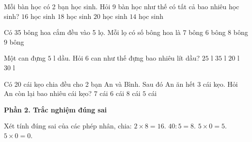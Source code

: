 \begin{ex} %
Mỗi bàn học có 2 bạn học sinh. Hỏi 9 bàn học như thế có tất cả bao nhiêu học sinh?
\choice
{$16$ học sinh}
{\True $18$ học sinh}
{$20$ học sinh}
{$14$ học sinh}
\end{ex}

\begin{ex} %
Có 35 bông hoa cắm đều vào 5 lọ. Mỗi lọ có số bông hoa là
\choice
{\True $7$ bông}
{$6$ bông}
{$8$ bông}
{$9$ bông}
\end{ex}

\begin{ex} %
Một can đựng $5\text{ l}$ dầu. Hỏi 6 can như thế đựng bao nhiêu lít dầu?
\choice
{$25\text{ l}$}
{$35\text{ l}$}
{$20\text{ l}$}
{\True $30\text{ l}$}
\end{ex}

\begin{ex} %
Có 20 cái kẹo chia đều cho 2 bạn An và Bình. Sau đó An ăn hết 3 cái kẹo. Hỏi An còn lại bao nhiêu cái kẹo?
\choice
{\True $7$ cái}
{$6$ cái}
{$8$ cái}
{$5$ cái}
\end{ex}

\textbf{Phần 2. Trắc nghiệm đúng sai}

\begin{ex} %
Xét tính đúng sai của các phép nhân, chia:
\choiceTF
{\True $2 \times 8 = 16$.}
{\True $40 : 5 = 8$.}
{$5 \times 0 = 5$.}
{\True $5 \times 0 = 0$.}
\end{ex}

